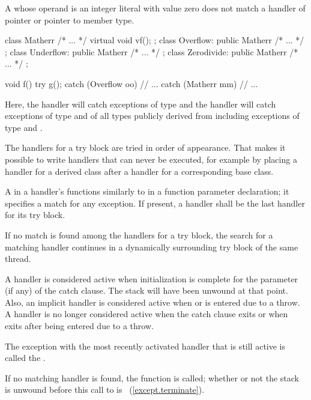 \enternote
A
whose operand is an integer literal with value zero does not match a handler of
pointer or pointer to member type.
\exitnote

\enterexample
\begin{codeblock}
class Matherr { /* ... */ virtual void vf(); };
class Overflow: public Matherr { /* ... */ };
class Underflow: public Matherr { /* ... */ };
class Zerodivide: public Matherr { /* ... */ };

void f() {
  try {
    g();
  } catch (Overflow oo) {
        // ...
  } catch (Matherr mm) {
        // ...
  }
}
\end{codeblock}
Here, the
handler will catch exceptions of type
and the
handler will catch exceptions of type
and of all types publicly derived from
including exceptions of type
and
.
\exitexample

\pnum
The handlers for a try block are tried in order of appearance.
That makes it possible to write handlers that can never be
executed, for example by placing a handler for a derived class after
a handler for a corresponding base class.

\pnum
A
in a handler's
functions similarly to
in a function parameter declaration;
it specifies a match for any exception.
If present, a
handler shall be the last handler for its try block.

\pnum
If no match is found among the handlers for a try block,
the search for a matching
handler continues in a dynamically surrounding try block
of the same thread.

\pnum
A handler is considered active when initialization is complete for
the parameter (if any) of the catch clause.
\enternote
The stack will have been unwound at that point.
\exitnote
Also, an implicit handler is considered active when
or
is entered due to a throw. A handler is no longer considered active when the
catch clause exits or when
exits after being entered due to a throw.

\pnum
The exception with the most recently activated handler that is
still active is called the
.

\pnum
If no matching handler is found,
the function
is called;
whether or not the stack is unwound before this call to
is ~(\ref{except.terminate}).

